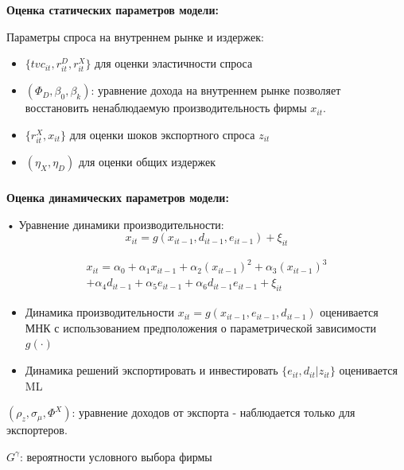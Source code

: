 \documentclass[c, dvipsnames]{beamer}  %
\begin{document}
\begin{frame}[shrink=3]
\frametitle{\insertsection} 

\textbf{Оценка статических параметров модели:}

Параметры спроса на внутреннем рынке и издержек: 


\begin{itemize}
	\item $\{tvc_{it},r^D_{it},r^X_{it}\}$ для оценки эластичности спроса
	\item $(\Phi_D, \beta_0, \beta_k )$: уравнение дохода на внутреннем рынке позволяет восстановить ненаблюдаемую производительность фирмы $x_{it}$.	
	\item $ \{r^X_{it}, x_{it}\}$ для оценки шоков экспортного спроса   $z_{it}$
	\item $(\eta_X , \eta_D)$ для оценки общих издержек

\end{itemize}







\end{frame}




\begin{frame}[shrink=3]
\frametitle{\insertsection} 


\textbf{Оценка динамических параметров модели:}



•  Уравнение динамики производительности:  $$x_{it} = g(x_{it−1}, d_{it−1}, e_{it−1}) + \xi_{it}$$

\begin{multline}
x_{it} = \alpha_0 + \alpha_1 x_{it−1} + \alpha_2(x_{it−1})^2 + \alpha_3(x_{it−1})^3  \\ + \alpha_4 d_{it−1} + \alpha_5e_{it−1} + \alpha_6d_{it−1}e_{it−1} + \xi_{it} 
\end{multline}



\begin{itemize}

	\item Динамика производительности $x_{it} = g(x_{it−1}, e_{it−1}, d_{it−1})$ 
	оценивается МНК с использованием предположения о  параметрической зависимости   $g(\cdot)$ 
	\item  Динамика  решений экспортировать и инвестировать 
	$\{e_{it}, d_{it}|z_{it}\}$ оценивается ML
\end{itemize}


$(\rho_z , \sigma_{\mu}, \Phi^X )$: уравнение доходов от экспорта - наблюдается только для экспортеров.


$G^{\gamma}$: вероятности условного выбора фирмы


\end{frame}
\end{document}
